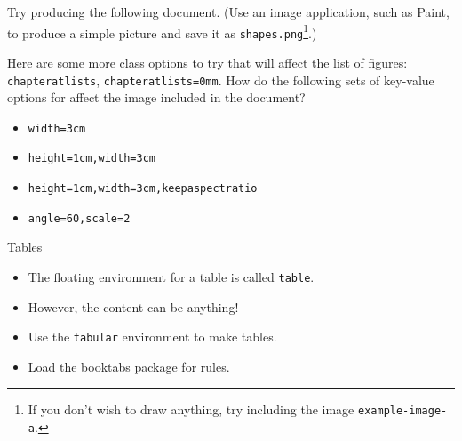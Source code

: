 \begin{exercise}
  Try producing the following document.
  (Use an image application, such as Paint, to produce a simple picture and save it as \texttt{shapes.png}\footnote{If you don't wish to draw anything, try including the image \texttt{example-image-a}.}.)
  
  Here are some more class options to try that will affect the list of figures: \texttt{chapteratlists}, \texttt{chapteratlists=0mm}.
  How do the following sets of key-value options for  affect the image included in the document?
  \begin{itemize}
    \item \texttt{width=3cm}
    \item \texttt{height=1cm,width=3cm}
    \item \texttt{height=1cm,width=3cm,keepaspectratio}
    \item \texttt{angle=60,scale=2}
  \end{itemize}
\end{exercise}

\begin{frame}{Tables}

  \begin{itemize}
	\item The floating environment for a table is called \texttt{table}.
	\item However, the content can be anything!
	\item Use the \texttt{tabular} environment to make tables.
	\item Load the \textsf{booktabs} package for rules.
  \end{itemize}

\end{frame}

